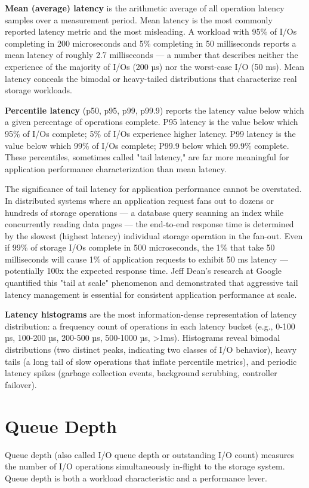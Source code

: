 \textbf{Mean (average) latency} is the arithmetic average of all operation latency samples over a measurement period. Mean latency is the most commonly reported latency metric and the most misleading. A workload with 95\% of I/Os completing in 200 microseconds and 5\% completing in 50 milliseconds reports a mean latency of roughly 2.7 milliseconds --- a number that describes neither the experience of the majority of I/Os (200 µs) nor the worst-case I/O (50 ms). Mean latency conceals the bimodal or heavy-tailed distributions that characterize real storage workloads.

\textbf{Percentile latency} (p50, p95, p99, p99.9) reports the latency value below which a given percentage of operations complete. P95 latency is the value below which 95\% of I/Os complete; 5\% of I/Os experience higher latency. P99 latency is the value below which 99\% of I/Os complete; P99.9 below which 99.9\% complete. These percentiles, sometimes called "tail latency," are far more meaningful for application performance characterization than mean latency.

The significance of tail latency for application performance cannot be overstated. In distributed systems where an application request fans out to dozens or hundreds of storage operations --- a database query scanning an index while concurrently reading data pages --- the end-to-end response time is determined by the slowest (highest latency) individual storage operation in the fan-out. Even if 99\% of storage I/Os complete in 500 microseconds, the 1\% that take 50 milliseconds will cause 1\% of application requests to exhibit 50 ms latency --- potentially 100x the expected response time. Jeff Dean's research at Google quantified this "tail at scale" phenomenon and demonstrated that aggressive tail latency management is essential for consistent application performance at scale.

\textbf{Latency histograms} are the most information-dense representation of latency distribution: a frequency count of operations in each latency bucket (e.g., 0-100 µs, 100-200 µs, 200-500 µs, 500-1000 µs, \textgreater1ms). Histograms reveal bimodal distributions (two distinct peaks, indicating two classes of I/O behavior), heavy tails (a long tail of slow operations that inflate percentile metrics), and periodic latency spikes (garbage collection events, background scrubbing, controller failover).

\section{Queue Depth}
Queue depth (also called I/O queue depth or outstanding I/O count) measures the number of I/O operations simultaneously in-flight to the storage system. Queue depth is both a workload characteristic and a performance lever.


